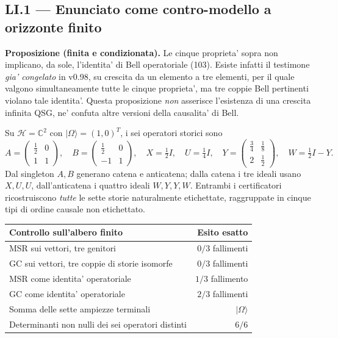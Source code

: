 \documentclass[11pt,a4paper]{article}
\begin{document}
\subsection*{LI.1 --- Enunciato come contro-modello a orizzonte finito}
\textbf{Proposizione (finita e condizionata).} Le cinque proprieta' sopra non implicano, da sole, l'identita' di Bell operatoriale (103). Esiste infatti il testimone \emph{gia' congelato} in v0.98, su crescita da un elemento a tre elementi, per il quale valgono simultaneamente tutte le cinque proprieta', ma tre coppie Bell pertinenti violano tale identita'. Questa proposizione \emph{non} asserisce l'esistenza di una crescita infinita QSG, ne' confuta altre versioni della causalita' di Bell.

Su $\mathcal H=\mathbb C^2$ con $|\Omega\rangle=(1,0)^T$, i sei operatori storici sono
\begin{equation}
 A=\begin{pmatrix}\tfrac12&0\\1&1\end{pmatrix},\quad
 B=\begin{pmatrix}\tfrac12&0\\-1&1\end{pmatrix},\quad
 X=\tfrac12 I,\quad U=\tfrac14 I,\quad
 Y=\begin{pmatrix}\tfrac34&\tfrac18\\2&\tfrac12\end{pmatrix},\quad W=\tfrac12I-Y.
 \tag{LI.1}
\end{equation}
Dal singleton $A,B$ generano catena e anticatena; dalla catena i tre ideali usano $X,U,U$, dall'anticatena i quattro ideali $W,Y,Y,W$. Entrambi i certificatori ricostruiscono \emph{tutte} le sette storie naturalmente etichettate, raggruppate in cinque tipi di ordine causale non etichettato.

\begin{center}\small
\renewcommand{\arraystretch}{1.15}
\begin{tabular}{p{9.5cm}r}
\toprule
Controllo sull'albero finito & Esito esatto\\\midrule
MSR sui vettori, tre genitori & $0/3$ fallimenti\\
GC sui vettori, tre coppie di storie isomorfe & $0/3$ fallimenti\\
MSR come identita' operatoriale & $1/3$ fallimento\\
GC come identita' operatoriale & $2/3$ fallimenti\\
Somma delle sette ampiezze terminali & $|\Omega\rangle$\\
Determinanti non nulli dei sei operatori distinti & $6/6$\\
\bottomrule
\end{tabular}
\end{center}
\end{document}
